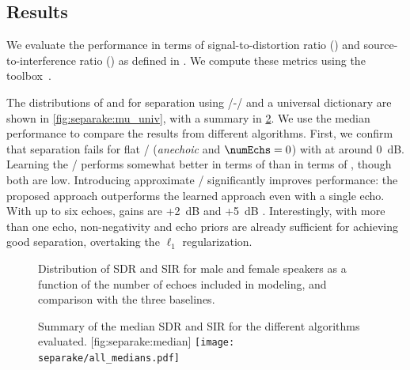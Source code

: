 \subsection{Results}
\label{sec:results}

We evaluate the performance in terms of signal-to-distortion ratio (\SDR) and source-to-interference ratio (\SIR) as defined in .
We compute these metrics using the  toolbox~.

\mynewline
The distributions of \SDR{} and \SIR{} for separation using \MU/-\NMF/ and a universal dictionary are shown in \cref{fig:separake:mu_univ}, with a summary in \cref{fig:separake:median}.
We use the median performance to compare the results from different algorithms.
First, we confirm that separation fails for flat \RTFs/ (\textit{anechoic} and $\numEchs=0$) with \SIR{} at around 0~dB.
Learning the \RTFs/ performs somewhat better in terms of \SIR{} than in terms of \SDR{}, though both are low.
Introducing approximate \RTFs/ significantly improves performance: the proposed approach outperforms the learned approach even with a single echo.
With up to six echoes, gains are +2~dB \SDR{} and +5~dB \SIR{}.
Interestingly, with more than one echo, non-negativity and echo priors are already sufficient for achieving good separation, overtaking the $\ell_1$ regularization.


\begin{figure}[t]
    \begin{fullwidth}
    \centering
    \hfill
    \hfill
    \caption{Distribution of SDR and SIR for male and female speakers as a function of the number of echoes included in modeling, and comparison with the three baselines.}
    \label{fig:separake:results}
    \end{fullwidth}
\end{figure}


\begin{figure}[b]
    \begin{sidecaption}[]{
            Summary of the median SDR and SIR for the different algorithms evaluated.
            \label{fig:separake:median}
        }[fig:separake:median]
        \centering
        \small
        \texttt{[image: separake/all\_medians.pdf]}
    \end{sidecaption}
\end{figure}


